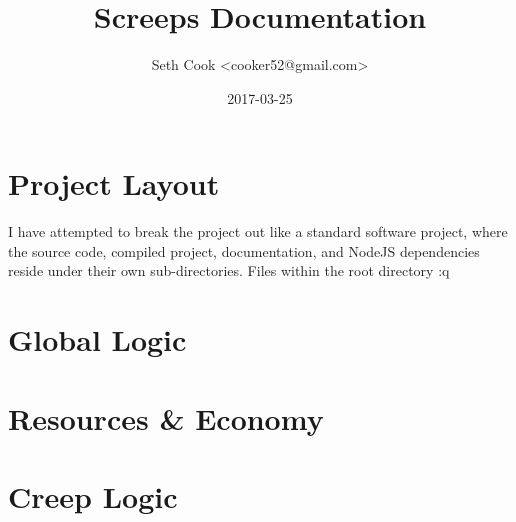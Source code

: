 \documentclass[a4paper,11pt,draft]{article}
\title{Screeps Documentation}
\author{Seth Cook \textless cooker52@gmail.com\textgreater}
\date{2017-03-25}
\begin{document}
  \maketitle

  \section{Project Layout}
  I have attempted to break the project out like a standard software project,
  where the source code, compiled project, documentation, and NodeJS
  dependencies reside under their own sub-directories. Files within the root
  directory :q


  \section{Global Logic}
  \section{Resources \& Economy}
  \section{Creep Logic}
\end{document}
